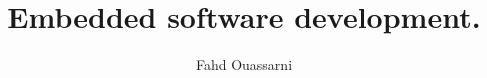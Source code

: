 \documentclass[a4paper]{article}
\begin{document}

\author{Fahd Ouassarni}
\title{Embedded software development.}

\address{6 Boulevard Mar\'echal Juin\\
		 14000 CAEN}

\maketitle

\end{document}
